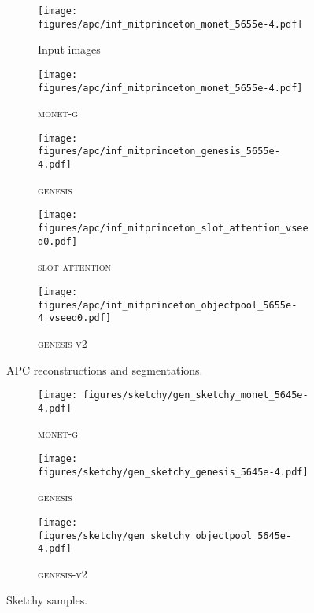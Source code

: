 \documentclass{article}
\begin{document}
\begin{figure}[h!]
	\centering
	\begin{subfigure}{\linewidth}
	    \texttt{[image: figures/apc/inf\_mitprinceton\_monet\_5655e-4.pdf]}
	    \caption{Input images}
	    \vspace{6pt}
	\end{subfigure}
	\begin{subfigure}{\linewidth}
	    \texttt{[image: figures/apc/inf\_mitprinceton\_monet\_5655e-4.pdf]}
	    \caption{\textsc{monet-g}}
	    \vspace{6pt}
	\end{subfigure}
	\begin{subfigure}{\linewidth}
	    \texttt{[image: figures/apc/inf\_mitprinceton\_genesis\_5655e-4.pdf]}
	    \caption{\textsc{genesis}}
	    \vspace{6pt}
	\end{subfigure}
	\begin{subfigure}{\linewidth}
	    \texttt{[image: figures/apc/inf\_mitprinceton\_slot\_attention\_vseed0.pdf]}
	    \caption{\textsc{slot-attention}}
	    \vspace{6pt}
	\end{subfigure}
	\begin{subfigure}{\linewidth}
\texttt{[image: figures/apc/inf\_mitprinceton\_objectpool\_5655e-4\_vseed0.pdf]}
	    \caption{\textsc{genesis-v2}}
	\end{subfigure}
	\caption{APC reconstructions and segmentations.}
\end{figure}

\begin{figure}[h!]
	\centering
	\begin{subfigure}{\linewidth}
	    \texttt{[image: figures/sketchy/gen\_sketchy\_monet\_5645e-4.pdf]}
	    \caption{\textsc{monet-g}}
	    \vspace{6pt}
	\end{subfigure}
	\begin{subfigure}{\linewidth}
	    \texttt{[image: figures/sketchy/gen\_sketchy\_genesis\_5645e-4.pdf]}
	    \caption{\textsc{genesis}}
	    \vspace{6pt}
	\end{subfigure}
    \begin{subfigure}{\linewidth}
	    \texttt{[image: figures/sketchy/gen\_sketchy\_objectpool\_5645e-4.pdf]}
	    \caption{\textsc{genesis-v2}}
	\end{subfigure}
	\caption{Sketchy samples.}
	\label{fig:gpp:sketchy:gen}
\end{figure}
\end{document}

